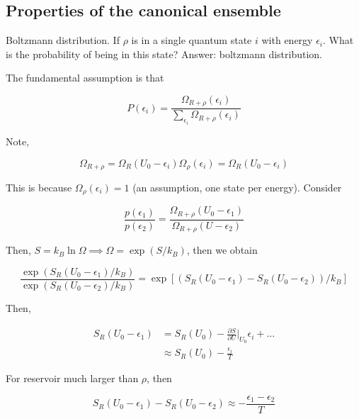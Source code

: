 \documentclass{article}
\newtheorem{one minute paper}[theorem]{One Minute Paper}
\begin{document}
\subsection*{Properties of the canonical ensemble}

Boltzmann distribution. If $\rho$ is in a single quantum state $i$ with energy $\epsilon_i$. What is the probability of being in this state? Answer: boltzmann distribution. 

The fundamental assumption is that 

\begin{equation}
    P(\epsilon_i) = \frac{\Omega_{R + \rho}(\epsilon_i)}{\sum_{\epsilon_i}\Omega_{R + \rho}(\epsilon_i)}
\end{equation}

Note, 

\begin{equation}
    \Omega_{R + \rho} = \Omega_R(U_0 - \epsilon_i)\Omega_\rho(\epsilon_i) = \Omega_R(U_0 - \epsilon_i)
\end{equation}

This is because $\Omega_{\rho}(\epsilon_i) = 1$ (an assumption, one state per energy). Consider 

\begin{equation}
    \frac{p(\epsilon_1)}{p(\epsilon_2)} = \frac{\Omega_{R + \rho}(U_0 - \epsilon_1)}{\Omega_{R + \rho}(U - \epsilon_2)}
\end{equation}

Then, $S = k_B \ln \Omega \implies \Omega = \exp(S/k_B)$, then we obtain 

\begin{equation}
    \frac{\exp(S_R(U_0 - \epsilon_1)/k_B)}{\exp(S_R(U_0 - \epsilon_2)/k_B)}  = \exp\left[ \left( S_R(U_0 - \epsilon_1) - S_R(U_0 - \epsilon_2) \right)/k_B \right]
\end{equation}

Then, 

\begin{align}
    S_R(U_0 - \epsilon_1) &= S_R(U_0) - \frac{\partial S}{\partial U}\bigg|_{U_0}\epsilon_i + \dots \\
    &\approx S_R(U_0) - \frac{\epsilon_i}{T}
\end{align}

For reservoir much larger than $\rho$, then 

\begin{equation}
    S_R(U_0 - \epsilon_1) - S_R(U_0 - \epsilon_2) \approx -\frac{\epsilon_1 - \epsilon_2}{T}
\end{equation}
\end{document}
